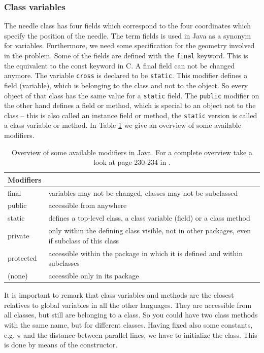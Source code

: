 \subsubsection{Class variables}
The needle class has four fields which correspond to the four
coordinates which specify the position of the needle. 
The term fields is used in Java as a synonym for variables.
Furthermore, we
need some specification for the geometry involved in the problem.
Some of the fields  are
defined with the \verb|final| keyword. This is the equivalent to the
const keyword in C. A final field can not be changed anymore.
The variable \verb|cross| is declared to be \verb|static|.  This
modifier 
defines a field (variable), which is belonging
to the class and not to the object. So every object of that class 
has the same value for a \verb|static| field. The \verb|public| modifier
on the other hand defines a field or method, which is special to 
an object not to the class -- this is also called an instance field or
method, the \verb|static| version is called a class variable or
method.
In Table \ref{tab:modifiers} we give an overview of some available modifiers.
\begin{table}[htbp]
  \begin{center}
    \leavevmode
    \begin{tabular}{l|p{8cm}}
     Modifiers &                                 \\ \hline \hline
     final & variables may not be changed, classes may not be 
                                   subclassed\\\hline
     public & accessible from anywhere\\ \hline
     static & defines a top-level class, a class variable (field) or 
                 a class method\\\hline
     private & only within the defining class visible, not in other 
               packages, even if subclass of this class\\\hline
     protected & accessible within the package in which it is defined and
                 within subclasses\\\hline
     (none) & accessible only in its package\\
    \end{tabular}
    \caption{Overview of some available modifiers in Java. For a complete
      overview take a look at page 230-234 in \cite{javanutshell}.}
    \label{tab:modifiers}
  \end{center}
\end{table}
It is important to remark that
class variables and methods are the closest relatives to global 
variables in all the other languages. They are accessible from all
classes, but still are belonging to a class. So you could have two
class methods with the same name, but for different classes.
Having fixed also some constants, e.g. $\pi$ and the distance between
parallel lines, we have to initialize the class. This is done by means
of the constructor.


